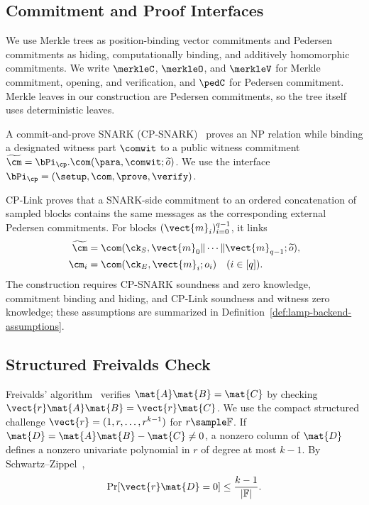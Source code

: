 \subsection{Commitment and Proof Interfaces}
\label{sec:prelim-commitments}

We use Merkle trees as position-binding vector commitments and Pedersen
commitments as hiding, computationally binding, and additively homomorphic
commitments.  We write \(\merkleC\), \(\merkleO\), and \(\merkleV\) for
Merkle commitment, opening, and verification, and \(\pedC\) for Pedersen
commitment.  Merkle leaves in our construction are Pedersen commitments, so
the tree itself uses deterministic leaves.

\label{sec:prelim-snark}
A commit-and-prove SNARK (CP-SNARK)~\cite{gnark,legosnark} proves an NP
relation while binding a designated witness part \(\comwit\) to a public
witness commitment \(\widetilde{\cm}=\bPi_{\cp}.\com(\para,\comwit;
\widetilde{o})\).  We use the interface
\(\bPi_{\cp}=(\setup,\com,\prove,\verify)\).

\label{sec:prelim-cplink}
CP-Link proves that a SNARK-side commitment to an ordered concatenation of
sampled blocks contains the same messages as the corresponding external
Pedersen commitments.  For blocks \((\vect{m}_i)_{i=0}^{q-1}\), it links
\[
\begin{aligned}
  \widetilde{\cm}
  &=\com(\ck_S,\vect{m}_0\|\cdots\|\vect{m}_{q-1};\widetilde{o}),\\
  \cm_i&=\com(\ck_E,\vect{m}_i;o_i)\quad(i\in[q]).
\end{aligned}
\]
The construction requires CP-SNARK soundness and zero knowledge, commitment
binding and hiding, and CP-Link soundness and witness zero knowledge; these
assumptions are summarized in Definition~\ref{def:lamp-backend-assumptions}.

\subsection{Structured Freivalds Check}
\label{sec:prelim-freivalds}

Freivalds' algorithm~\cite{freivalds1977probabilistic} verifies
\(\mat{A}\mat{B}=\mat{C}\) by checking
\(\vect{r}\mat{A}\mat{B}=\vect{r}\mat{C}\).  We use the compact structured
challenge \(\vect{r}=(1,r,\ldots,r^{k-1})\) for
\(r\sample\mathbb{F}\).  If
\(\mat{D}=\mat{A}\mat{B}-\mat{C}\neq0\), a nonzero column of \(\mat{D}\)
defines a nonzero univariate polynomial in \(r\) of degree at most \(k-1\).
By Schwartz--Zippel~\cite{schwartz1980fast,zippel1979probabilistic},
\[
  \Pr[\vect{r}\mat{D}=0]\le\frac{k-1}{|\mathbb{F}|}.
\]
